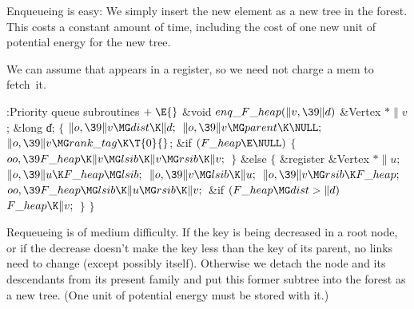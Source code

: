 Enqueueing is easy: We simply insert the new element as a new tree in
the forest. This costs a constant amount of time, including the cost of
one new unit of potential energy for the new tree.

We can assume that  appears in a register, so we
need not
charge a mem to fetch~it.

\Y\B\4:Priority queue subroutines\X${}\mathrel+\E{}$\6
\1\1\&{void} ${}\\{enq\_F\_heap}(\|v,\39\|d){}$\6
\&{Vertex} ${}{*}\|v{}$;\6
\&{long} \|d;\2\2\6
${}\{{}$\1\6
${}\|o,\39\|v\MG\\{dist}\K\|d;{}$\6
${}\|o,\39\|v\MG\\{parent}\K\NULL;{}$\6
${}\|o,\39\|v\MG\\{rank\_tag}\K\T{0}{}$;\6
\&{if} ${}(\\{F\_heap}\E\NULL){}$\5
${}\{{}$\1\6
${}\\{oo},\39\\{F\_heap}\K\|v\MG\\{lsib}\K\|v\MG\\{rsib}\K\|v;{}$\6
\4${}\}{}$\5
\2\&{else}\5
${}\{{}$\5
\1\&{register} \&{Vertex} ${}{*}\|u;{}$\7
${}\|o,\39\|u\K\\{F\_heap}\MG\\{lsib};{}$\6
${}\|o,\39\|v\MG\\{lsib}\K\|u;{}$\6
${}\|o,\39\|v\MG\\{rsib}\K\\{F\_heap};{}$\6
${}\\{oo},\39\\{F\_heap}\MG\\{lsib}\K\|u\MG\\{rsib}\K\|v;{}$\6
\&{if} ${}(\\{F\_heap}\MG\\{dist}>\|d){}$\1\5
${}\\{F\_heap}\K\|v;{}$\2\6
\4${}\}{}$\2\6
\4${}\}{}$\2\par
\fi

Requeueing is of medium difficulty. If the key is being decreased in
a root node, or if the decrease doesn't make the key less than the key
of its parent, no links need to change (except possibly 
itself). Otherwise we detach the node and its descendants from its
present family and put this former subtree into the forest as a new
tree. (One unit of potential energy must be stored with it.)

